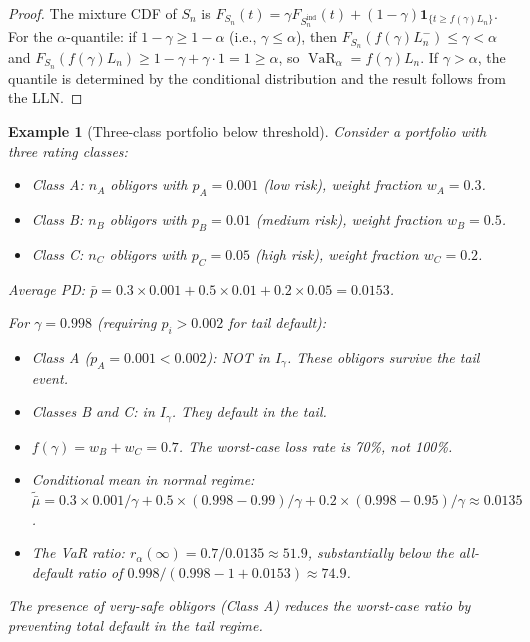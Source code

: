 \documentclass[11pt]{article}
\newtheorem{example}[theorem]{Example}
\theoremstyle{definition}
\newcommand{\VaR}{\operatorname{VaR}}
\newcommand{\1}{\mathbf{1}}
\begin{document}
\begin{proof}
The mixture CDF of $S_n$ is $F_{S_n}(t) = \gamma F_{S_n^{\mathrm{ind}}}(t) + (1-\gamma) \1_{\{t \geq f(\gamma) L_n\}}$. For the $\alpha$-quantile: if $1 - \gamma \geq 1 - \alpha$ (i.e., $\gamma \leq \alpha$), then $F_{S_n}(f(\gamma)L_n^-) \leq \gamma < \alpha$ and $F_{S_n}(f(\gamma)L_n) \geq 1 - \gamma + \gamma \cdot 1 = 1 \geq \alpha$, so $\VaR_\alpha = f(\gamma)L_n$. If $\gamma > \alpha$, the quantile is determined by the conditional distribution and the result follows from the LLN.
\end{proof}

\begin{example}[Three-class portfolio below threshold]\label{ex:below_threshold}
Consider a portfolio with three rating classes:
\begin{itemize}
  \item Class A: $n_A$ obligors with $p_A = 0.001$ (low risk), weight fraction $w_A = 0.3$.
  \item Class B: $n_B$ obligors with $p_B = 0.01$ (medium risk), weight fraction $w_B = 0.5$.
  \item Class C: $n_C$ obligors with $p_C = 0.05$ (high risk), weight fraction $w_C = 0.2$.
\end{itemize}
Average PD: $\bar{p} = 0.3 \times 0.001 + 0.5 \times 0.01 + 0.2 \times 0.05 = 0.0153$.

For $\gamma = 0.998$ (requiring $p_i > 0.002$ for tail default):
\begin{itemize}
  \item Class A ($p_A = 0.001 < 0.002$): NOT in $I_\gamma$. These obligors survive the tail event.
  \item Classes B and C: in $I_\gamma$. They default in the tail.
  \item $f(\gamma) = w_B + w_C = 0.7$. The worst-case loss rate is 70\%, not 100\%.
  \item Conditional mean in normal regime: $\tilde{\bar{\mu}} = 0.3 \times 0.001/\gamma + 0.5 \times (0.998-0.99)/\gamma + 0.2 \times (0.998-0.95)/\gamma \approx 0.0135$.
  \item The VaR ratio: $r_\alpha(\infty) = 0.7 / 0.0135 \approx 51.9$, substantially below the all-default ratio of $0.998/(0.998 - 1 + 0.0153) \approx 74.9$.
\end{itemize}
The presence of very-safe obligors (Class A) \emph{reduces} the worst-case ratio by preventing total default in the tail regime.
\end{example}
\end{document}
